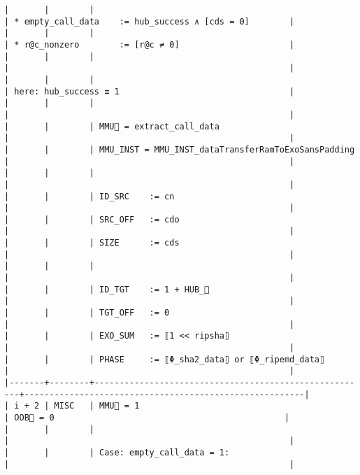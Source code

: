 \documentclass[varwidth=\maxdimen,margin=0.5cm,multi={verbatim}]{standalone}
\begin{document}
\begin{verbatim}
|       |        |                                                       | * empty_call_data    := hub_success ∧ [cds = 0]        |
|       |        |                                                       | * r@c_nonzero        := [r@c ≠ 0]                      |
|       |        |                                                       |                                                        |
|       |        |                                                       | here: hub_success ≡ 1                                  |
|       |        |                                                       |                                                        |
|       |        | MMU🏴 = extract_call_data                             |                                                        |
|       |        | MMU_INST = MMU_INST_dataTransferRamToExoSansPadding   |                                                        |
|       |        |                                                       |                                                        |
|       |        | ID_SRC    := cn                                       |                                                        |
|       |        | SRC_OFF   := cdo                                      |                                                        |
|       |        | SIZE      := cds                                      |                                                        |
|       |        |                                                       |                                                        |
|       |        | ID_TGT    := 1 + HUB_                                |                                                        |
|       |        | TGT_OFF   := 0                                        |                                                        |
|       |        | EXO_SUM   := ⟦1 << ripsha⟧                            |                                                        |
|       |        | PHASE     := ⟦Φ_sha2_data⟧ or ⟦Φ_ripemd_data⟧         |                                                        |
|-------+--------+-------------------------------------------------------+--------------------------------------------------------|
| i + 2 | MISC   | MMU🏴 = 1                                             | OOB🏴 = 0                                              |
|       |        |                                                       |                                                        |
|       |        | Case: empty_call_data = 1:                            |                                                        |

\end{verbatim}
\end{document}
